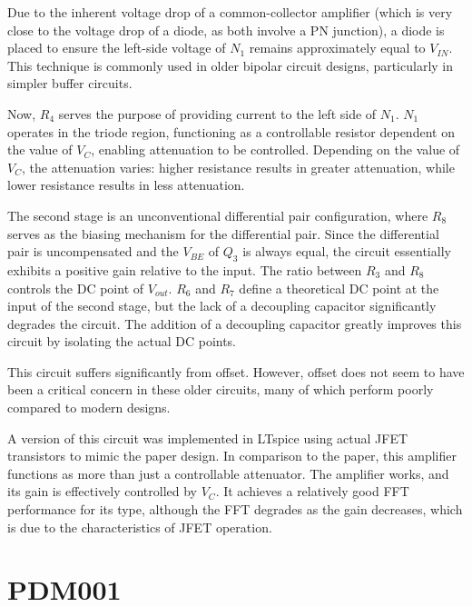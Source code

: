 \documentclass[12pt]{article}
\begin{document}
Due to the inherent voltage drop of a common-collector amplifier (which is very close to the voltage drop of a diode, as both involve a PN junction), a diode is placed to ensure the left-side voltage of $N_1$ remains approximately equal to $V_{IN}$. This technique is commonly used in older bipolar circuit designs, particularly in simpler buffer circuits.

Now, $R_4$ serves the purpose of providing current to the left side of $N_1$. $N_1$ operates in the triode region, functioning as a controllable resistor dependent on the value of $V_C$, enabling attenuation to be controlled. Depending on the value of $V_C$, the attenuation varies: higher resistance results in greater attenuation, while lower resistance results in less attenuation.

The second stage is an unconventional differential pair configuration, where $R_8$ serves as the biasing mechanism for the differential pair. Since the differential pair is uncompensated and the $V_{BE}$ of $Q_3$ is always equal, the circuit essentially exhibits a positive gain relative to the input. The ratio between $R_3$ and $R_8$ controls the DC point of $V_{out}$. $R_6$ and $R_7$ define a theoretical DC point at the input of the second stage, but the lack of a decoupling capacitor significantly degrades the circuit. The addition of a decoupling capacitor greatly improves this circuit by isolating the actual DC points.

This circuit suffers significantly from offset. However, offset does not seem to have been a critical concern in these older circuits, many of which perform poorly compared to modern designs.  

A version of this circuit was implemented in LTspice using actual JFET transistors to mimic the paper design. In comparison to the paper, this amplifier functions as more than just a controllable attenuator. The amplifier works, and its gain is effectively controlled by $V_C$. It achieves a relatively good FFT performance for its type, although the FFT degrades as the gain decreases, which is due to the characteristics of JFET operation.









\section{PDM001}
\end{document}
